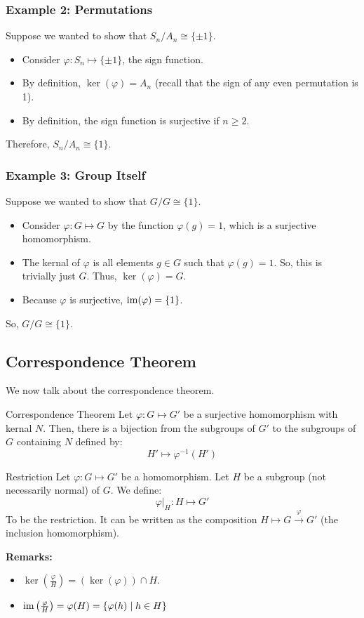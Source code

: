 \documentclass[letterpaper]{article}
\begin{document}
\subsubsection{Example 2: Permutations}
Suppose we wanted to show that $S_n / A_n \cong \{\pm 1\}$. 
\begin{itemize}
    \item Consider $\varphi: S_n \mapsto \{\pm 1\}$, the sign function. 
    \item By definition, $\ker(\varphi) = A_n$ (recall that the sign of any even permutation is 1). 
    \item By definition, the sign function is surjective if $n \geq 2$. 
\end{itemize}
Therefore, $S_n / A_n \cong \{1\}$. 

\subsubsection{Example 3: Group Itself}
Suppose we wanted to show that $G / G \cong \{1\}$.
\begin{itemize}
    \item Consider $\varphi: G \mapsto G$ by the function $\varphi(g) = 1$, which is a surjective homomorphism.
    \item The kernal of $\varphi$ is all elements $g \in G$ such that $\varphi(g) = 1$. So, this is trivially just $G$. Thus, $\ker(\varphi) = G$. 
    \item Because $\varphi$ is surjective, $\operatorname{im}(\varphi) = \{1\}$.  
\end{itemize}
So, $G / G \cong \{1\}$. 

\subsection{Correspondence Theorem}
We now talk about the correspondence theorem.
\begin{theorem}{Correspondence Theorem}{}
    Let $\varphi: G \mapsto G'$ be a surjective homomorphism with kernal $N$. Then, there is a bijection from the subgroups of $G'$ to the subgroups of $G$ containing $N$ defined by: 
    \[H' \mapsto \varphi^{-1}(H')\]
\end{theorem}

\begin{definition}{Restriction}{}
    Let $\varphi: G \mapsto G'$ be a homomorphism. Let $H$ be a subgroup (not necessarily normal) of $G$. We define: 
    \[\varphi |_{H}: H \mapsto G'\]
    To be the restriction. It can be written as the composition $H \mapsto G \xrightarrow{\varphi} G'$ (the inclusion homomorphism). 
\end{definition}
\textbf{Remarks:}
\begin{itemize}
    \item $\ker\left(\frac{\varphi}{H}\right) = (\ker(\varphi)) \cap H$.
    \item $\operatorname{im}\left(\frac{\varphi}{H}\right) = \varphi(H) = \{\varphi(h) \mid h \in H\}$
\end{itemize}
\end{document}
